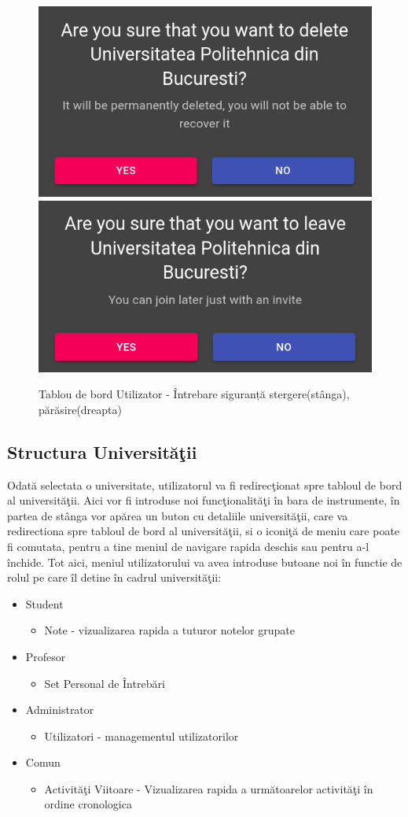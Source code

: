\documentclass[12pt, a4paper, oneside, romanian]{teza-upb}
\begin{document}
\begin{figure}[H]
\centering
\includegraphics*[width=0.45\columnwidth]{tablou-de-bord-utilizator-intrebare-siguranta-stergere}
\includegraphics*[width=0.45\columnwidth]{tablou-de-bord-utilizator-intrebare-siguranta-parasire}
\caption{Tablou de bord Utilizator - Întrebare siguranță stergere(stânga), părăsire(dreapta)}
\label{tablou-de-bord-utilizator-intrebare-siguranta}
\end{figure}

\subsection{Structura Universităţii}

Odată selectata o universitate, utilizatorul va fi redirecţionat spre tabloul de bord al universităţii. Aici vor fi introduse noi funcţionalităţi în bara de instrumente, în partea de stânga vor apărea un buton cu detaliile universităţii, care va redirectiona spre tabloul de bord al universităţii, si o iconiţă de meniu care poate fi comutata, pentru a tine meniul de navigare rapida deschis sau pentru a-l închide. Tot aici, meniul utilizatorului va avea introduse butoane noi în functie de rolul pe care îl detine în cadrul universităţii:
\begin{itemize}
	\item Student
		\begin{itemize}
			\item Note - vizualizarea rapida a tuturor notelor grupate
		\end{itemize}
	\item Profesor
		\begin{itemize}
			\item Set Personal de Întrebări
		\end{itemize}
	\item Administrator
		\begin{itemize}
			\item Utilizatori - managementul utilizatorilor
		\end{itemize}
	\item Comun
		\begin{itemize}
			\item Activităţi Viitoare - Vizualizarea rapida a următoarelor activităţi în ordine cronologica
		\end{itemize}
\end{itemize}
\end{document}
